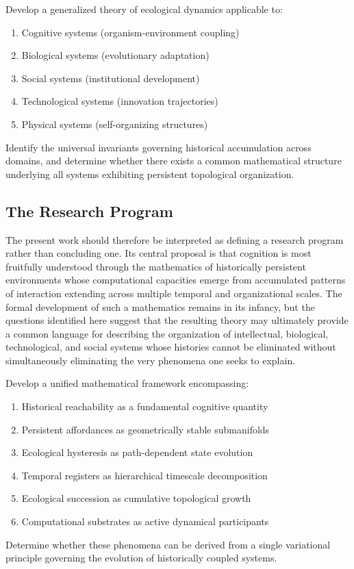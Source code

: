 \documentclass[12pt,oneside]{article}
\theoremstyle{remark}
\begin{document}
\begin{problem}
Develop a generalized theory of ecological dynamics applicable to:
\begin{enumerate}
\item Cognitive systems (organism-environment coupling)
\item Biological systems (evolutionary adaptation)
\item Social systems (institutional development)
\item Technological systems (innovation trajectories)
\item Physical systems (self-organizing structures)
\end{enumerate}
Identify the universal invariants governing historical accumulation across domains, and determine whether there exists a common mathematical structure underlying all systems exhibiting persistent topological organization.
\end{problem}

\subsection{The Research Program}

The present work should therefore be interpreted as defining a research program rather than concluding one. Its central proposal is that cognition is most fruitfully understood through the mathematics of historically persistent environments whose computational capacities emerge from accumulated patterns of interaction extending across multiple temporal and organizational scales. The formal development of such a mathematics remains in its infancy, but the questions identified here suggest that the resulting theory may ultimately provide a common language for describing the organization of intellectual, biological, technological, and social systems whose histories cannot be eliminated without simultaneously eliminating the very phenomena one seeks to explain.

\begin{problem}
Develop a unified mathematical framework encompassing:
\begin{enumerate}
\item Historical reachability as a fundamental cognitive quantity
\item Persistent affordances as geometrically stable submanifolds
\item Ecological hysteresis as path-dependent state evolution
\item Temporal registers as hierarchical timescale decomposition
\item Ecological succession as cumulative topological growth
\item Computational substrates as active dynamical participants
\end{enumerate}
Determine whether these phenomena can be derived from a single variational principle governing the evolution of historically coupled systems.
\end{problem}
\end{document}
